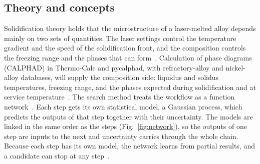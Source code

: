 \documentclass[12pt,letterpaper]{article}
\begin{document}
\subsection{Theory and concepts}
Solidification theory holds that the microstructure of a laser-melted alloy
depends mainly on two sets of quantities. The laser settings control the
temperature gradient and the speed of the solidification front, and the
composition controls the freezing range and the phases that can
form~\cite{debroy2018}.
Calculation of phase diagrams (CALPHAD) in Thermo-Calc and pycalphad, with
refractory-alloy and nickel-alloy databases, will supply the composition side:
liquidus and solidus temperatures, freezing range, and the phases expected
during solidification and at service
temperature~\cite{andersson2002,otis2017}. The search method treats the
workflow as a function network~\cite{astudillo2021}. Each step gets its own
statistical model, a Gaussian process, which predicts the outputs of that
step together with their uncertainty. The models are linked in the same order as
the steps (Fig.~\ref{fig:network}), so the outputs of one step are inputs to
the next and uncertainty carries through the whole chain. Because each step has
its own model, the network learns from partial results, and a candidate can
stop at any step~\cite{buathong2024}.
\end{document}
